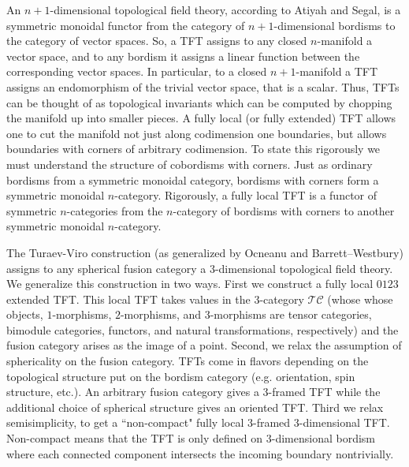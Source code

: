 \documentclass{amsart}
\begin{document}


An $n+1$-dimensional topological field theory, according to Atiyah and Segal, is a symmetric monoidal functor from the category of $n+1$-dimensional bordisms to the category of vector spaces.  So, a TFT assigns to any closed $n$-manifold a vector space, and to any bordism it assigns a linear function between the corresponding vector spaces.  In particular, to a closed $n+1$-manifold a TFT assigns an endomorphism of the trivial vector space, that is a scalar.  Thus, TFTs can be thought of as topological invariants which can be computed by chopping the manifold up into smaller pieces.  A fully local (or fully extended) TFT allows one to cut the manifold not just along codimension one boundaries, but allows boundaries with corners of arbitrary codimension.  To state this rigorously we must understand the structure of cobordisms with corners.  Just as ordinary bordisms from a symmetric monoidal category, bordisms with corners  form a symmetric monoidal $n$-category.  Rigorously, a fully local TFT is a functor of symmetric $n$-categories from the $n$-category of bordisms with corners to another symmetric monoidal $n$-category.  

The Turaev-Viro construction (as generalized by Ocneanu and Barrett--Westbury) assigns to any spherical fusion category a 3-dimensional topological field theory.  We generalize this construction in two ways.  First we construct a fully local $0123$ extended TFT.  This local TFT takes values in the $3$-category $\mathcal{TC}$ (whose whose objects, $1$-morphisms, $2$-morphisms, and $3$-morphisms are tensor categories, bimodule categories, functors, and natural transformations, respectively) and the fusion category arises as the image of a point.  Second, we relax the assumption of sphericality on the fusion category.  TFTs come in flavors depending on the topological structure put on the bordism category (e.g. orientation, spin structure, etc.).  An arbitrary fusion category gives a $3$-framed TFT while the additional choice of spherical structure gives an oriented TFT.  Third we relax semisimplicity, to get a ``non-compact" fully local $3$-framed $3$-dimensional TFT.  Non-compact means that the TFT is only defined on $3$-dimensional bordism where each connected component intersects the incoming boundary nontrivially.
\end{document}
